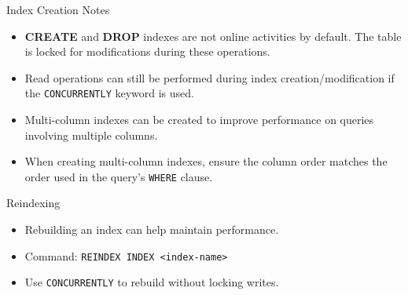 \documentclass[aspectratio=169]{beamer}
\begin{document}
\begin{frame}{Index Creation Notes}
  \begin{itemize}
    \item \textbf{CREATE} and \textbf{DROP} indexes are not online activities by default.
          The table is locked for modifications during these operations.

    \item Read operations can still be performed during index creation/modification
          if the \texttt{CONCURRENTLY} keyword is used.

    \item Multi-column indexes can be created to improve performance on queries
          involving multiple columns.

    \item When creating multi-column indexes, ensure the column order matches
          the order used in the query’s \texttt{WHERE} clause.
  \end{itemize}
\end{frame}


\begin{frame}{Reindexing}
    \begin{itemize}
        \item Rebuilding an index can help maintain performance.
        \item Command: \texttt{REINDEX INDEX <index-name>}
        \item Use \texttt{CONCURRENTLY} to rebuild without locking writes.
    \end{itemize}
\end{frame}

\end{document}
